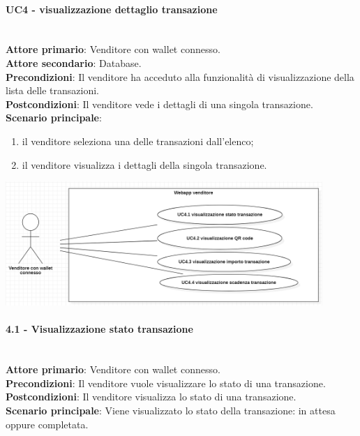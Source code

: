 \documentclass[a4paper, 12pt]{article}
\begin{document}
\paragraph{UC4 - visualizzazione dettaglio transazione}\\
\textbf{Attore primario}: Venditore con wallet connesso.\\
\textbf{Attore secondario}: Database.\\
\textbf{Precondizioni}: Il venditore ha acceduto alla funzionalità di visualizzazione della lista delle transazioni.\\
\textbf{Postcondizioni}: Il venditore vede i dettagli di una singola transazione.\\
\textbf{Scenario principale}:
\begin{enumerate}
\item il venditore seleziona una delle transazioni dall'elenco;
\item il venditore visualizza i dettagli della singola transazione.
\end{enumerate}

\includegraphics[width=0.9\textwidth]{UC_WAV4}

\paragraph{4.1 - Visualizzazione stato transazione}\\
\textbf{Attore primario}: Venditore con wallet connesso.\\
\textbf{Precondizioni}: Il venditore vuole visualizzare lo stato di una transazione.\\
\textbf{Postcondizioni}: Il venditore visualizza lo stato di una transazione.\\
\textbf{Scenario principale}: Viene visualizzato lo stato della transazione: in attesa oppure completata.\\
\end{document}
